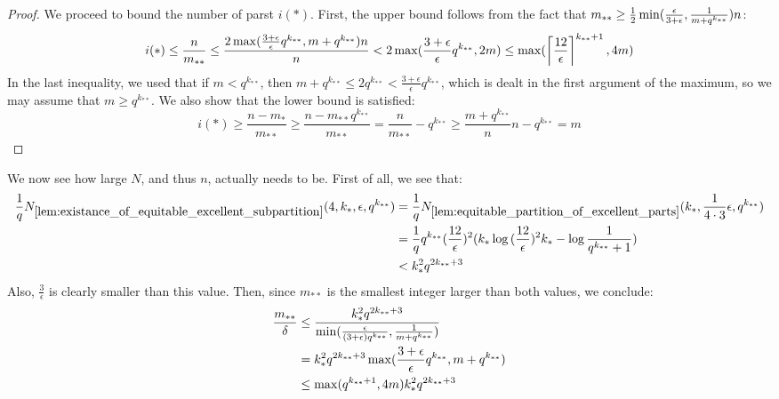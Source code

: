 \begin{theorem}[Theorem 5.18]
\begin{proof}
                We proceed to bound the number of parst $i(*)$.
                First, the upper bound follows from the fact that
                $m_{**} \geq \frac{1}{2} \min ( \frac{\epsilon} {3 + \epsilon}, \frac{1}{m + q^{k_{**}}} ) n$:
                \[
                    i(*) \leq \frac{n}{m_{**}} \leq \frac{2 \max ( \frac{3 + \epsilon}{\epsilon} q^{k_{**}}, m + q^{k_{**}} )n}{n}
                         < 2 \max ( \frac{3 + \epsilon}{\epsilon} q^{k_{**}}, 2m )
                         \leq \max ( \left\lceil \frac{12}{\epsilon} \right\rceil^{k_{**}+1}, 4m )
                \]
                In the last inequality, we used that if $m < q^{k_{**}}$, then $m + q^{k_{**}} \leq 2q^{k_{**}} < \frac{3 + \epsilon}{\epsilon} q^{k_{**}}$,
                which is dealt in the first argument of the maximum, so we may assume that $m \geq q^{k_{**}}$.
                We also show that the lower bound is satisfied:
                \[
                    i(*) \geq \frac{n - m_*}{m_{**}}
                         \geq \frac{n - m_{**}q^{k_{**}}}{m_{**}}
                         = \frac{n}{m_{**}} - q^{k_{**}}
                         \geq \frac{m + q^{k_{**}}}{n} n - q^{k_{**}}
                         = m
                \]
            \end{proof}
        \end{theorem}

        \begin{remark}
            We now see how large $N$, and thus $n$, actually needs to be.
            First of all, we see that:
            \begin{align*}
                \frac{1}{q} N_{\ref{lem:existance_of_equitable_excellent_subpartition}}( 4, k_*, \epsilon, q^{k_{**}} )
                    & = \frac{1}{q} N_{\ref{lem:equitable_partition_of_excellent_parts}}( k_*, \frac{1}{4 \cdot 3} \epsilon, q^{k_{**}} ) \\
                    & = \frac{1}{q} q^{k_{**}} ( \frac{12}{\epsilon} )^2
                        ( k_* \log{( \frac{12}{\epsilon} )^2 k_*} - \log{\frac{1}{q^{k_{**}}+1}} ) \\
                    & < k_*^2 q^{2 k_{**} + 3}
            \end{align*}
            Also, $\frac{3}{\epsilon}$ is clearly smaller than this value.
            Then, since $m_{**}$ is the smallest integer larger than both values, we conclude:
            \begin{align*}
                \frac{m_{**}}{\delta}
                    & \leq \frac{k_*^2 q^{2 k_{**} + 3}}
                        {\min ( \frac{\epsilon}{( 3 + \epsilon ) q^{k_{**}}}, \frac{1}{m + q^{k_{**}}} )} \\
                    & = k_*^2 q^{2 k_{**} + 3} \max ( \frac{3 + \epsilon}{\epsilon} q^{k_{**}}, m + q^{k_{**}} ) \\
                    & \leq \max ( q^{k_{**} + 1}, 4m ) k_*^2 q^{2 k_{**} + 3}
            \end{align*}
        \end{remark}


